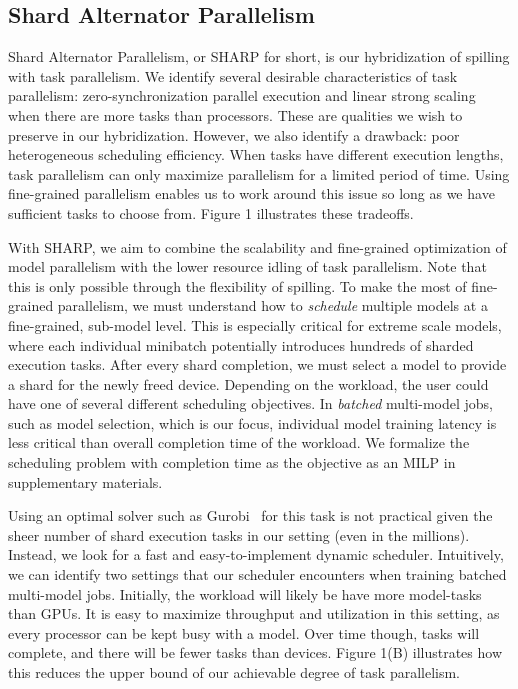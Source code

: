 \documentclass{article}
\begin{document}
{{\begin{figure}
\end{figure}

\subsection{Shard Alternator Parallelism}

Shard Alternator Parallelism, or SHARP for short, is our hybridization of spilling with task parallelism. We identify several desirable characteristics of task parallelism: zero-synchronization parallel execution and linear strong scaling when there are more tasks than processors. These are qualities we wish to preserve in our hybridization. However, we also identify a drawback: poor heterogeneous scheduling efficiency. When tasks have different execution lengths, task parallelism can only maximize parallelism for a limited period of time. Using fine-grained parallelism enables us to work around this issue so long as we have sufficient tasks to choose from. Figure 1 illustrates these tradeoffs.

With SHARP, we aim to combine the scalability and fine-grained optimization of model parallelism with the lower resource idling of task parallelism. Note that this is only possible through the flexibility of spilling. To make the most of fine-grained parallelism, we must understand how to \textit{schedule} multiple models at a fine-grained, sub-model level. This is especially critical for extreme scale models, where each individual minibatch potentially introduces hundreds of sharded execution tasks. After every shard completion, we must select a model to provide a shard for the newly freed device. Depending on the workload, the user could have one of several different scheduling objectives. In \textit{batched} multi-model jobs, such as model selection, which is our focus, individual model training latency is less critical than overall completion time of the workload. We formalize the scheduling problem with completion time as the objective as an MILP in supplementary materials.

Using an optimal solver such as Gurobi~\cite{gurobi} for this task is not practical given the sheer number of shard execution tasks in our setting (even in the millions). Instead, we look for a fast and easy-to-implement dynamic scheduler. Intuitively, we can identify two settings that our scheduler encounters when training batched multi-model jobs. Initially, the workload will likely be have more model-tasks than GPUs. It is easy to maximize throughput and utilization in this setting, as every processor can be kept busy with a model. Over time though, tasks will complete, and there will be fewer tasks than devices. Figure 1(B) illustrates how this reduces the upper bound of our achievable degree of task parallelism.

}}
\end{document}
